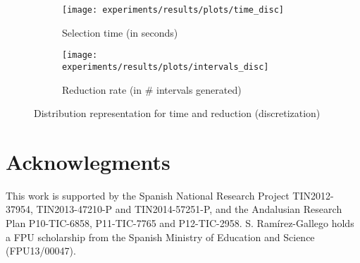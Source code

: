 \documentclass[preprint,12pt]{elsarticle}
\begin{document}
\begin{figure}
\begin{subfigure}{.5\textwidth}
  \centering
  \texttt{[image: experiments/results/plots/time\_disc]}
  \caption{Selection time (in seconds)}
  \label{fig:time-disc}
\end{subfigure}%
\begin{subfigure}{.5\textwidth}
  \centering
  \texttt{[image: experiments/results/plots/intervals\_disc]}
  \caption{Reduction rate (in \# intervals generated)}
  \label{fig:interv-disc}
\end{subfigure}
\caption{Distribution representation for time and reduction (discretization)}
\label{fig:disc}
\end{figure}


\section*{Acknowlegments}

This work is supported by the Spanish National Research Project TIN2012-37954, TIN2013-47210-P and TIN2014-57251-P, and the Andalusian Research Plan P10-TIC-6858, P11-TIC-7765 and P12-TIC-2958. S. Ram\'irez-Gallego holds a FPU scholarship from the Spanish Ministry of Education and Science (FPU13/00047).



 



%
%
%
\end{document}
